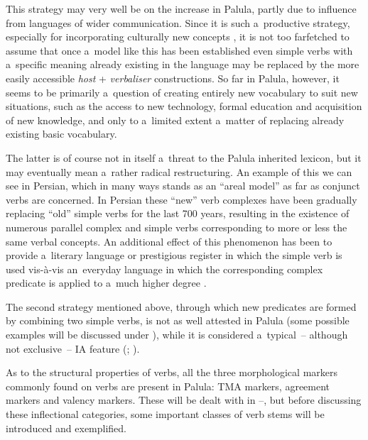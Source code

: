This strategy may very well be on the increase in Palula, partly due to influence from languages of wider communication. Since it is such a~productive strategy, especially for incorporating culturally new concepts \citep[85]{gambhir1993}, it is not too farfetched to assume that once a~model like this has been established even simple verbs with a~specific meaning already existing in the language may be replaced by the more easily accessible \textit{host} + \textit{verbaliser} constructions. So far in Palula, however, it seems to be primarily a~question of creating entirely new vocabulary to suit new situations, such as the access to new technology, formal education and acquisition of new knowledge, and only to a~limited extent a~matter of replacing already existing basic vocabulary. 



The latter is of course not in itself a~threat to the Palula inherited lexicon, but it may eventually mean a~rather radical restructuring. An example of this we can see in Persian, which in many ways stands as an ``areal model'' as far as conjunct verbs are concerned. In Persian these ``new'' verb complexes have been gradually replacing ``old'' simple verbs for the last 700 years, resulting in the existence of numerous parallel complex and simple verbs corresponding to more or less the same verbal concepts. An additional effect of this phenomenon has been to provide a~literary language or prestigious register in which the simple verb is used vis-à-vis an~everyday language in which the corresponding complex predicate is applied to a~much higher degree \citep[1369]{follietal2005}. 



The second strategy mentioned above, through which new predicates are formed by combining two simple verbs, is not as well attested in Palula (some possible examples will be discussed under ), while it is considered a~typical~-- although not exclusive~-- IA feature (\citealt[559]{ebert2006}; \citealt[250--252]{masica2001}). 



As to the structural properties of verbs, all the three morphological markers commonly found on verbs \citep[409]{viberg2006} are present in Palula: TMA markers, agreement markers and valency markers. These will be dealt with in --, but before discussing these inflectional categories, some important classes of verb stems will be introduced and exemplified.


